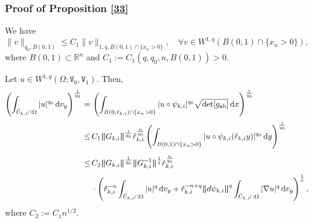 \documentclass[reqno, 11pt, a4paper]{amsart}
\numberwithin{equation}{section}
\newcommand{\dvg}{\textnormal{d}v_g}
\newcommand{\dx}{\textnormal{d}x}
\newcommand{\gij}{\textnormal{a}  \textnormal{b}}
\newcommand{\wghtv}{\mathtt{V}}
\newcommand{\qxp}{q}
\newcommand{\dy}{\textnormal{d}y}
\newcommand{\bnorm}{\boldsymbol{\|}}
\begin{document}
\subsubsection{Proof of Proposition \ref{33}}

We have
$$
\|v\|_{\qxp_0,B(0,1)}\leq C_1\|v\|_{1,\qxp,B(0,1)\cap\{x_n>0\}},
\quad\forall v\in W^{1,\qxp}(B(0,1)\cap\{x_n>0\}),
$$
where $B(0,1)\subset \mathbb{R}^n$ and $C_1:=C_1(\qxp , \qxp _0 , n , B(0,1)) >0 $.

Let $u\in W^{1,\qxp}(\Omega;\wghtv_0,\wghtv_1)$. Then,
\begin{equation*}
\begin{aligned}
\left(\int_{\hat U_{k,i}\cap\Omega}|u|^{\qxp_0}\,\dvg\right)^{\frac1{\qxp_0}}
= &\,\displaystyle \left(\int_{ B(0 , \hat r_{k,i} )\cap \{x_n >0\} } | u \circ \psi _{k,i} |^{ \qxp _0 }  \sqrt{\det [ g_{\gij} ]} \, \dx \right)^{\frac{1}{ \qxp _0 }}\\[3pt]
  \leq & \displaystyle \,  C_1  \bnorm G_{k,i}\bnorm ^{\frac{1}{ \qxp _0 }}  \hat{r}_{k,i}^{\frac{n}{ \qxp _0  }} \left(\int_{ B(0 , 1 ) \cap \{x_n >0\} } | u \circ \psi _{k,i}(\hat r _{k,i} y) |^{ \qxp _0 } \,  \dy \right)^{\frac{1}{   \qxp _0}  }\\[5pt]
\leq&\,\displaystyle C_2  \bnorm G_{k,i}\bnorm^{\frac1{\qxp_0}}
\bnorm G_{k,i}^{-1}\bnorm^{\frac1\qxp}\hat r_{k,i}^{\frac n{\qxp_0}}\\[3pt]
&\,\displaystyle\cdot\left(\hat r_{k,i}^{-n}\int_{\hat U_{k,i}\cap\Omega}|u|^{\qxp}\,\dvg
+\hat r_{k,i}^{-n+\qxp}\bnorm d\psi_{k,i}\bnorm^{\qxp}
\int_{\hat U_{k,i}\cap\Omega}|\nabla u|^{\qxp}\,\dvg\right)^{\frac1\qxp},
\end{aligned}
\end{equation*}
where $C_2:= C_1 n^{1/2}$.
\end{document}

